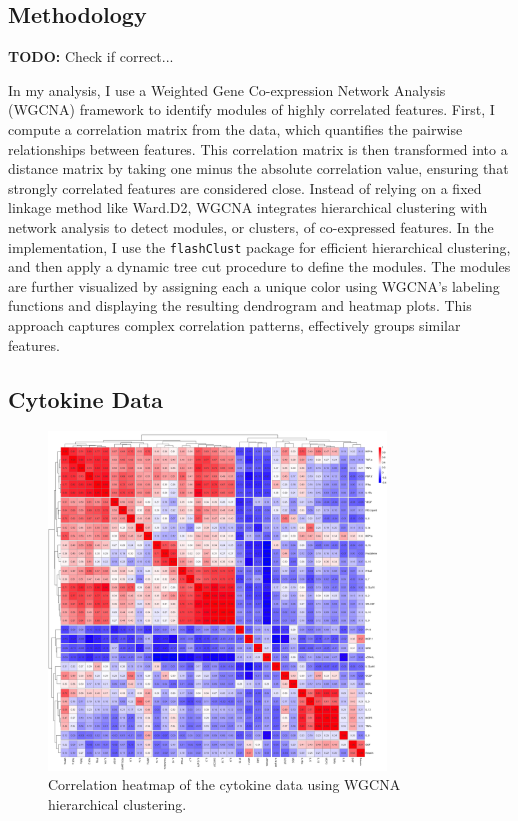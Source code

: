 \documentclass[12pt,a4paper]{report}
\newcommand{\todo}[1]{%
  \par\noindent%
  \begin{tcolorbox}[colback=yellow, colframe=black, boxrule=0.5pt, sharp corners, width=\linewidth, before skip=5pt, after skip=5pt]
    \textbf{TODO:} #1
  \end{tcolorbox}%
  \par
}
\begin{document}
\subsection{Methodology}

\todo{Check if correct...}
\noindent
In my analysis, I use a Weighted Gene Co-expression Network Analysis (WGCNA) framework to identify modules of highly correlated features. First, I compute a correlation matrix from the data, which quantifies the pairwise relationships between features. This correlation matrix is then transformed into a distance matrix by taking one minus the absolute correlation value, ensuring that strongly correlated features are considered close. Instead of relying on a fixed linkage method like Ward.D2, WGCNA integrates hierarchical clustering with network analysis to detect modules, or clusters, of co-expressed features. In the implementation, I use the \texttt{flashClust} package for efficient hierarchical clustering, and then apply a dynamic tree cut procedure to define the modules. The modules are further visualized by assigning each a unique color using WGCNA’s labeling functions and displaying the resulting dendrogram and heatmap plots. This approach captures complex correlation patterns, effectively groups similar features.

\pagebreak
\subsection{Cytokine Data}
\begin{figure}[H]
  \centering
  \includegraphics[width=0.8\textwidth]{images/Cytokine_euclidean_distance.png}
  \caption[cytokines data correlations]{Correlation heatmap of the cytokine data using  WGCNA hierarchical clustering.}
  \label{fig:cytokine_heatmap}
\end{figure}
\end{document}
